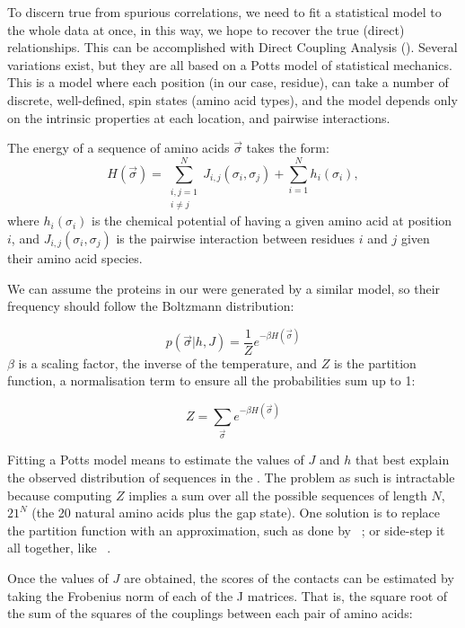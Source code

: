 To discern true from spurious correlations, we need to fit a statistical model to the whole data at once, in this way, we hope to recover the true (direct) relationships.
This can be accomplished with Direct Coupling Analysis (\DCA).
Several variations exist, but they are all based on a Potts model of statistical mechanics.
This is a model where each position (in our case, residue), can take a number of discrete, well-defined, spin states (amino acid types), and the model depends only on the intrinsic properties at each location, and pairwise interactions.

The energy of a sequence of amino acids $\vec{\sigma}$ takes the form:
\begin{equation*}
H(\vec \sigma) = \sum_{\substack{i,j=1\\i \neq j}}^N J_{i, j}(\sigma_i, \sigma_j) + \sum_{i=1}^N h_i(\sigma_i),
\end{equation*}
where $h_i(\sigma_i)$ is the chemical potential of having a given amino acid at position $i$, and $ J_{i, j}(\sigma_i, \sigma_j)$ is the pairwise interaction between residues $i$ and $j$ given their amino acid species.

We can assume the proteins in our \MSA{} were generated by a similar model, so their frequency should follow the Boltzmann distribution:

\begin{equation*}
p(\vec{\sigma} |  h, J) = \frac{1}{Z} e^{-\beta H\left(\vec{\sigma}\right)}
\end{equation*}
$\beta$ is a scaling factor, the inverse of the temperature, and $Z$ is the partition function, a normalisation term to ensure all the probabilities sum up to 1:

\begin{equation*}
Z = \sum_{\vec{\sigma}} e^{-\beta H\left(\vec{\sigma}\right)}
\end{equation*}

Fitting a Potts model means to estimate the values of $J$ and $h$ that best explain the observed distribution of sequences in the \MSA.
The problem as such is intractable because computing $Z$ implies a sum over all the possible sequences of length $N$, $21^N$ (the 20 natural amino acids plus the gap state).
One solution is to replace the partition function with an approximation, such as done by \plmDCA~\citep{plmDCA};
or side-step it all together, like \GaussDCA~\citep{GaussDCA}.

Once the values of $J$ are obtained, the scores of the contacts can be estimated by taking the Frobenius norm of each of the J matrices.
That is, the square root of the sum of the squares of the couplings between each pair of amino acids:

